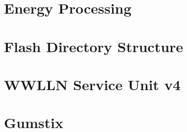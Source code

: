 
\chapter{Energy Processing}

\chapter{Flash Directory Structure}

\chapter{WWLLN Service Unit v4}

\chapter{Gumstix}

